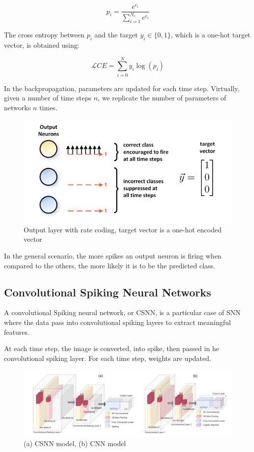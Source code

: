 \documentclass[11pt]{article}
\begin{document}
$$ p_i = \frac{e^{c_i}}{\sum_{i=1}^{N_c} e^{c_i}} $$ 

The cross entropy between $p_i$ and the target $y_i \in \{0, 1\}$, which is a one-hot target vector, is obtained using:

$$ \mathcal{L}CE = \sum_{i=0}^{N} y_i \log(p_i) $$

In the backpropagation, parameters are updated for each time step. Virtually, given a number of time steps $n$, we replicate the number of parameters of networks $n$ times.



\begin{figure}[H]
    \centering
    \includegraphics[width=\textwidth]{./image/loss_cross_entropy_snn_train.png}
    \caption{Output layer with rate coding, target vector is a one-hot encoded vector}
    \label{fig:snn_output}
\end{figure}

In the general scenario, the more spikes an output neuron is firing when compared to the others, the more likely it is to be the predicted class. 

\subsection{Convolutional Spiking Neural Networks}

A convolutional Spiking neural network, or CSNN, is a particular case of SNN where the data pass into convolutional spiking layers to extract meaningful features.

At each time step, the image is converted, into spike, then passed in he convolutional spiking layer. For each time step, weights are updated.


\begin{figure}[H]
    \centering
    \includegraphics[width=\textwidth]{./image/csnn_template.png}
    \caption{(a) CSNN model, (b) CNN model}
    \label{fig:csnn_template}
\end{figure}
\end{document}
